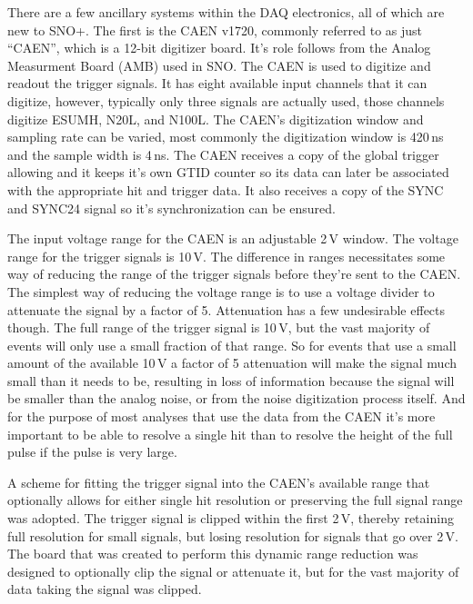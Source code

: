 There are a few ancillary systems within the DAQ electronics, all
of which are new to SNO+.
The first is the CAEN v1720, commonly
referred to as just ``CAEN'', which is a 12-bit digitizer board.
It's role follows from the Analog Measurment Board (AMB) used in
SNO.
The CAEN is used to digitize and readout the trigger signals.
It has eight available input channels that it can digitize, however,
typically only three signals are actually used, those channels digitize ESUMH, N20L, and
N100L. The CAEN's digitization window and sampling rate can be varied,
most commonly the digitization window is 420\,ns and the sample width
is 4\,ns. The CAEN receives a copy of the global trigger allowing and
it keeps it's own GTID counter so its data can later be associated
with the appropriate hit and trigger data. It also receives a copy of the
SYNC and SYNC24 signal so it's synchronization can be ensured.

The input voltage range for the CAEN is an adjustable 2\,V window.
The voltage range for the trigger signals is 10\,V.
The difference in ranges necessitates some way of reducing the range of the trigger signals
before they're sent to the CAEN.
The simplest way of reducing the voltage range is to use a voltage
divider to attenuate the signal by a factor of 5.
Attenuation has a few undesirable effects though.
The full range of the trigger signal is 10\,V, but the vast
majority of events will only use a small fraction of that range.
So for events that use a small amount of the available 10\,V a factor
of 5 attenuation will make the signal much small than it needs to be,
resulting in loss of information because the signal will be smaller than
the analog noise, or from the noise digitization process itself.
And for the purpose of most analyses that use the data from the CAEN
it's more important to be able to resolve a single hit than to resolve
the height of the full pulse if the pulse is very large.

A scheme for fitting the trigger signal into the CAEN's available range that
optionally allows for either single hit resolution or preserving the full
signal range was adopted.
The trigger signal is clipped within the first 2\,V, thereby retaining full
resolution for small signals, but losing resolution for signals that go over
2\,V.
The board that was created to perform this dynamic range reduction
was designed to optionally clip the signal or attenuate it, but
for the vast majority of data taking the signal was clipped.

